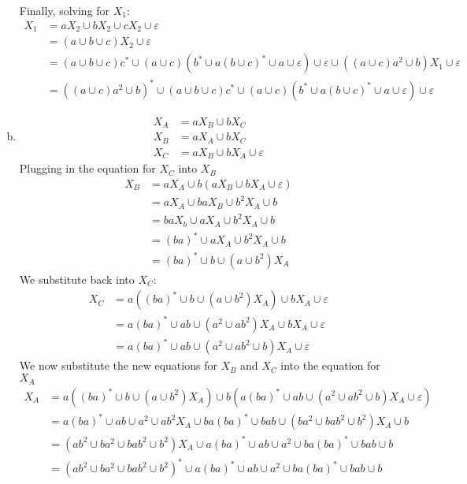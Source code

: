 \begin{solution}
\begin{enumerate}[(a)]
    Finally, solving for $X_1$:
    \begin{align*}
        X_1 &= aX_2\cup bX_2\cup cX_2\cup\varepsilon\\
            &= (a\cup b\cup c)X_2\cup\varepsilon\\
            &= (a\cup b\cup c)c^*\cup (a\cup c)(b^*\cup a(b\cup c)^*\cup a\cup\varepsilon)\cup\varepsilon\cup((a\cup c)a^2\cup b)X_1\cup\varepsilon\\
            &= ((a\cup c)a^2\cup b)^*\cup(a\cup b\cup c)c^*\cup (a\cup c)(b^*\cup a(b\cup c)^*\cup a\cup\varepsilon)\cup\varepsilon
    \end{align*}
        \item
    \begin{align*}
        X_A &= aX_B\cup bX_C\\
        X_B &= aX_A\cup bX_C\\
        X_C &= aX_B\cup bX_A\cup\varepsilon
    \end{align*}
    Plugging in the equation for $X_C$ into $X_B$
    \begin{align*}
        X_B &= aX_A\cup b(aX_B\cup bX_A\cup\varepsilon)\\
            &= aX_A\cup baX_B\cup b^2X_A\cup b\\
            &= baX_b\cup aX_A\cup b^2X_A\cup b\\
            &= (ba)^*\cup aX_A\cup b^2X_A\cup b\\
            &= (ba)^*\cup b\cup (a\cup b^2)X_A
    \end{align*}
    We substitute back into $X_C$:
    \begin{align*}
        X_C &= a((ba)^*\cup b\cup (a\cup b^2)X_A)\cup bX_A\cup\varepsilon\\
            &= a(ba)^*\cup ab\cup (a^2\cup ab^2)X_A\cup bX_A\cup\varepsilon\\
            &= a(ba)^*\cup ab\cup (a^2\cup ab^2\cup b)X_A\cup\varepsilon
    \end{align*}
    We now substitute the new equations for $X_B$ and $X_C$ into the equation for $X_A$
    \begin{align*}
        X_A &= a\left((ba)^*\cup b\cup (a\cup b^2)X_A\right)\cup b(a(ba)^*\cup ab\cup (a^2\cup ab^2\cup b)X_A\cup\varepsilon)\\
            &= a(ba)^*\cup ab\cup a^2\cup ab^2X_A\cup ba(ba)^*\cup bab \cup (ba^2\cup bab^2\cup b^2)X_A\cup b\\
            &= (ab^2\cup ba^2\cup bab^2\cup b^2)X_A\cup a(ba)^*\cup ab\cup a^2\cup ba(ba)^*\cup bab \cup b\\
            &= (ab^2\cup ba^2\cup bab^2\cup b^2)^*\cup a(ba)^*\cup ab\cup a^2\cup ba(ba)^*\cup bab \cup b
    \end{align*}
    \end{enumerate}
\end{solution}
